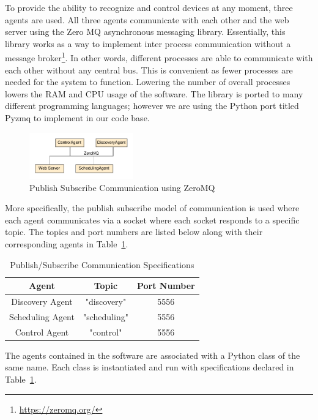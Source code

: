 \documentclass[conference]{IEEEtran}
\begin{document}
To provide the ability to recognize and control devices at any moment, three agents are used. All three agents communicate with each other and the web server using the Zero MQ asynchronous messaging library. Essentially, this library works as a way to implement inter process communication without a message
broker\footnote{\href{https://zeromq.org/}{https://zeromq.org/}}. In other words, different processes are able to communicate with each
other without any central bus. This is convenient as fewer processes are needed for the system to function. Lowering the number of overall processes lowers the
RAM and CPU usage of the software. The library is ported to many different programming languages; however we are using the Python port titled Pyzmq to
implement in our code base.
%
\begin{figure}[htbp]
    \centering
    \includegraphics[width=0.4\textwidth]{figs/agents/pubSubAgents.pdf}
    \caption{Publish Subscribe Communication using ZeroMQ}
    \label{fig:pubSubAgents}
\end{figure}

More specifically, the publish subscribe model of communication is used where
each agent communicates via a socket where each socket responds to a specific
topic. The topics and port numbers are listed below along with their
corresponding agents in Table~\ref{tab:pubsubspecs}. %
%
\begin{table}[htbp]
    \centering
    \begin{tabular}{|c|c|c|}
        \hline
        Agent & Topic & Port Number\\
        \hline
        Discovery Agent & "discovery" & 5556\\
        Scheduling Agent & "scheduling" & 5556\\
        Control Agent & "control" & 5556\\
        \hline
    \end{tabular}
    \caption{Publish/Subscribe Communication Specifications}
    \label{tab:pubsubspecs}
\end{table}
%
The agents contained in the software are associated with a Python class of the
same name. Each class is instantiated and run with specifications declared in
Table~\ref{tab:pubsubspecs}. 
\end{document}
